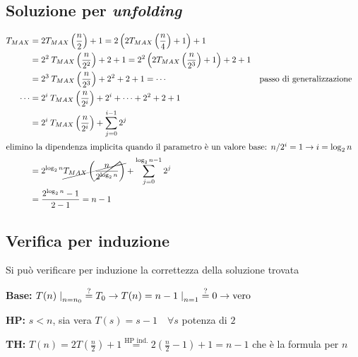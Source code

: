 \subsection{Soluzione per \textit{unfolding}}
\begin{align*}
        T_{MAX} &=
        2 T_{MAX} \left( \frac{n}{2} \right) + 1
        = 2 \left( 2 T_{MAX} \left( \frac{n}{4} \right) + 1 \right) + 1 \\
        &= 2^2 \:T_{MAX} \left( \frac{n}{2^2} \right) +2 +1
        = 2^2 \left( 2 T_{MAX} \left( \frac{n}{2^3} \right) + 1 \right) +2+1 \\
        &= 2^3 \:T_{MAX} \left( \frac{n}{2^3} \right) +2^2 +2 +1 = \cdots 
        & \text{passo di generalizzazione} & \\
        \cdots &=2^i \:T_{MAX} \left( \frac{n}{2^i} \right) +2^i + \cdots +2^2 +2 +1 \\
        &= 2^i \:T_{MAX} \left( \frac{n}{2^i} \right) + \sum_{j=0}^{i-1} 2^j \\
        \intertext{elimino la dipendenza implicita quando il parametro è un valore base: $n / 2^i=1 \rightarrow i=\log_2 n$}
        &= 2^{\log_2 n} \cancel{ T_{MAX} \left( \cancel{\frac{n}{2^{\log_2 n}} } \right) } 
        + \sum_{j=0}^{\log_2 n-1} 2^j \\
        &= \frac{2^{\log_2 n}-1}{2-1} = n-1
\end{align*}

\subsection{Verifica per induzione}
Si può verificare per induzione la correttezza della soluzione trovata 

\begin{description}
    \item{\textbf{Base:}} $T(n)\left. \right|_{n=n_0} \overset{?}{=} T_0 \rightarrow 
            T(n)=n-1 \left. \right|_{n=1} \overset{?}{=} 0 \rightarrow \text{vero}$
    \item{\textbf{HP:}} $s < n$, sia vera $T(s) = s-1 \quad \forall s $ potenza di $2$
    \item{\textbf{TH:}} $T(n) = 2T \left( \frac{n}{2} \right) +1 \overset{\text{HP ind.}}{=} 
            2 \left( \frac{n}{2}-1 \right)+1 = n-1$ che è la formula per $n$
\end{description}

